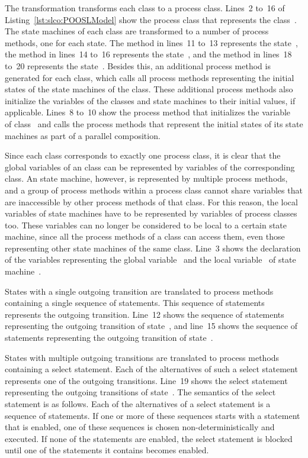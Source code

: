 The transformation transforms each \SLCO class to a \POOSL process class.
Lines~2 to~16 of Listing~\ref{lst:slco:POOSLModel} show the process class that represents the \SLCO class~.
The state machines of each class are transformed to a number of process methods, one for each state.
The method in lines~11 to~13 represents the state~, the method in lines~14 to~16 represents the state~, and the method in lines~18 to~20 represents the state~.
Besides this, an additional process method is generated for each class, which calls all process methods representing the initial states of the state machines of the class.
These additional process methods also initialize the variables of the classes and state machines to their initial values, if applicable.
Lines~8 to~10 show the process method that initializes the variable~ of class~ and calls the process methods that represent the initial states of its state machines as part of a parallel composition.

Since each \SLCO class corresponds to exactly one \POOSL process class, it is clear that the global variables of an \SLCO class can be represented by variables of the corresponding \POOSL class.
An \SLCO state machine, however, is represented by multiple process methods, and a group of process methods within a process class cannot share variables that are inaccessible by other process methods of that class.
For this reason, the local variables of \SLCO state machines have to be represented by variables of process classes too.
These variables can no longer be considered to be local to a certain state machine, since all the process methods of a class can access them, even those representing other state machines of the same class.
Line~3 shows the declaration of the \POOSL variables representing the global \SLCO variable~ and the local \SLCO variable~ of state machine~.

States with a single outgoing transition are translated to process methods containing a single sequence of statements.
This sequence of statements represents the outgoing transition.
Line~12 shows the sequence of statements representing the outgoing transition of state~, and line~15 shows the sequence of statements representing the outgoing transition of state~.

States with multiple outgoing transitions are translated to process methods containing a select statement.
Each of the alternatives of such a select statement represents one of the outgoing transitions.
Line~19 shows the select statement representing the outgoing transitions of state~.
The semantics of the \POOSL select statement is as follows.
Each of the alternatives of a select statement is a sequence of statements.
If one or more of these sequences starts with a statement that is enabled, one of these sequences is chosen non-deterministically and executed.
If none of the statements are enabled, the select statement is blocked until one of the statements it contains becomes enabled.

